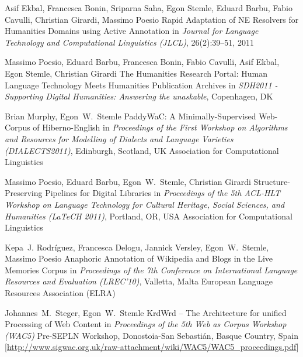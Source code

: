 \documentclass[11pt,a4paper]{moderncv}
\begin{document}

        {Asif Ekbal, Francesca Bonin, Sriparna Saha, Egon Stemle, Eduard Barbu,
        Fabio Cavulli, Christian Girardi, Massimo Poesio}
        {\small Rapid Adaptation of NE Resolvers for Humanities Domains using
        Active Annotation}
        {\small in {\em Journal for Language Technology and Computational Linguistics (JLCL)},
        26(2):39--51, 2011}
        {}
        {}

        {Massimo Poesio, Eduard Barbu, Francesca Bonin, Fabio Cavulli, Asif
        Ekbal, Egon Stemle, Christian Girardi}
        {\small The Humanities Research Portal: Human Language Technology Meets
        Humanities Publication Archives}
        {\small in {\em SDH2011 - Supporting Digital Humanities: Answering the
        unaskable}, Copenhagen, DK}
        {}
        {}

        {Brian Murphy, Egon~W.~Stemle}
        {\small PaddyWaC: A Minimally-Supervised Web-Corpus of Hiberno-English}
        {\small in {\em Proceedings of the First Workshop on Algorithms and
        Resources for Modelling of Dialects and Language Varieties
        (DIALECTS2011)}, Edinburgh, Scotland, UK}
        {\small Association for Computational Linguistics}
        {}

        {Massimo Poesio, Eduard Barbu, Egon~W.~Stemle, Christian Girardi}
        {Structure-Preserving Pipelines for Digital Libraries}
        {\small in {\em Proceedings of the 5th ACL-HLT Workshop on Language
        Technology for Cultural Heritage, Social Sciences, and Humanities
        (LaTeCH 2011)}, Portland, OR, USA}
        {\small Association for Computational Linguistics}
        {}

        {Kepa~J. Rodr{\'i}guez, Francesca Delogu, Jannick Versley,
        Egon~W.~Stemle, Massimo Poesio} {Anaphoric Annotation of Wikipedia
        and Blogs in the Live Memories Corpus}
        {\small in {\em Proceedings of the 7th Conference on International
        Language Resources and Evaluation (LREC'10)}, Valletta, Malta}
        {\small European Language Resources Association (ELRA)}
        {}

        {Johannes~M.~Steger, Egon~W.~Stemle}
        {{KrdWrd} -- The Architecture for unified Processing of Web Content}
        {\small in {\em Proceedings of the 5th Web as Corpus Workshop (WAC5)}}
        {\small Pre-SEPLN Workshop, Donostoia-San Sebasti{\'a}n, Basque
        Country, Spain}
        {[\url{http://www.sigwac.org.uk/raw-attachment/wiki/WAC5/WAC5_proceedings.pdf}]}
\end{document}
